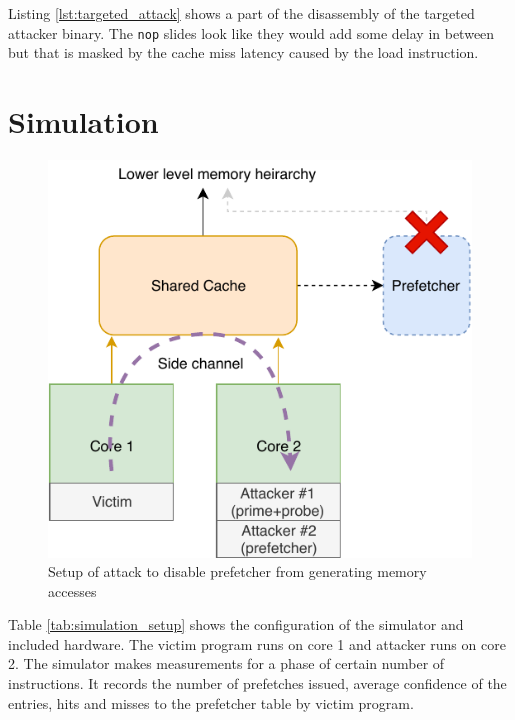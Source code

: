 \documentclass[conference]{IEEEtran}
\begin{document}
Listing \ref{lst:targeted_attack} shows a part of the disassembly of the targeted
attacker binary.
The \texttt{nop} slides look like they would add some delay in between but
that is masked by the cache miss latency caused by the load instruction.

\section{Simulation}

\begin{figure}
    \centering
    \includegraphics[width=\columnwidth]{prefetch_attack}
    \caption{Setup of attack to disable prefetcher from generating memory accesses}
    \label{fig:prefetch_setup}
\end{figure}

Table \ref{tab:simulation_setup} shows the configuration of
the simulator and included hardware.
The victim program runs on core 1 and attacker runs on core 2.
The simulator makes measurements for a phase of certain number of instructions.
It records the number of prefetches issued, average confidence of the entries,
hits and misses to the prefetcher table by victim program.
\end{document}
